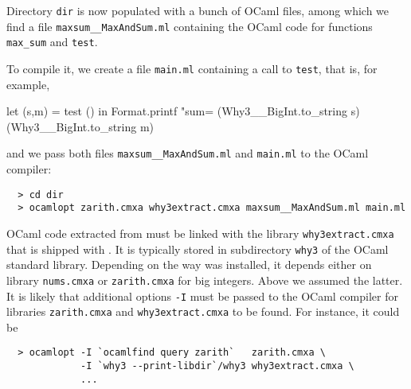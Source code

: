 Directory \texttt{dir} is now populated with a bunch of OCaml files,
among which we find a file \texttt{maxsum\_\_MaxAndSum.ml} containing
the OCaml code for functions \texttt{max\_sum} and \texttt{test}.

To compile it, we create a file \texttt{main.ml}
containing a call to \texttt{test}, that is, for example,
\begin{whycode}
  let (s,m) = test () in
  Format.printf "sum=%
    (Why3__BigInt.to_string s) (Why3__BigInt.to_string m)
\end{whycode}
and we pass both files \texttt{maxsum\_\_MaxAndSum.ml} and
\texttt{main.ml} to the OCaml compiler:
\begin{verbatim}
  > cd dir
  > ocamlopt zarith.cmxa why3extract.cmxa maxsum__MaxAndSum.ml main.ml
\end{verbatim}
OCaml code extracted from \why must be linked with the library
\texttt{why3extract.cmxa} that is shipped with \why. It is typically
stored in subdirectory \texttt{why3} of the OCaml standard library.
Depending on the way \why was installed, it depends either on library
\texttt{nums.cmxa} or \texttt{zarith.cmxa} for big integers. Above we
assumed the latter. It is likely that additional options \texttt{-I}
must be passed to the OCaml compiler for libraries
\texttt{zarith.cmxa} and \texttt{why3extract.cmxa} to be found.
For instance, it could be
\begin{verbatim}
  > ocamlopt -I `ocamlfind query zarith`   zarith.cmxa \
             -I `why3 --print-libdir`/why3 why3extract.cmxa \
             ...
\end{verbatim}


